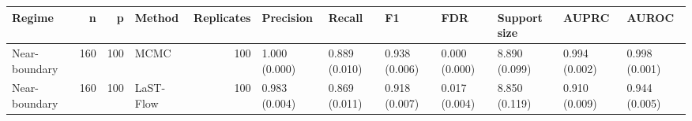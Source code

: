 \begin{tabular}{lrrlrlllllll}
\toprule
Regime & n & p & Method & Replicates & Precision & Recall & F1 & FDR & Support size & AUPRC & AUROC \\
\midrule
Near-boundary & 160 & 100 & MCMC & 100 & 1.000 (0.000) & 0.889 (0.010) & 0.938 (0.006) & 0.000 (0.000) & 8.890 (0.099) & 0.994 (0.002) & 0.998 (0.001) \\
Near-boundary & 160 & 100 & LaST-Flow & 100 & 0.983 (0.004) & 0.869 (0.011) & 0.918 (0.007) & 0.017 (0.004) & 8.850 (0.119) & 0.910 (0.009) & 0.944 (0.005) \\
\bottomrule
\end{tabular}
